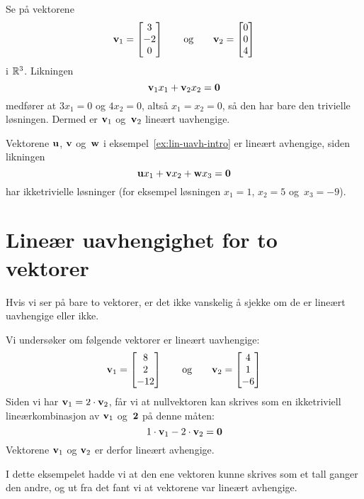 \begin{ex}
Se på vektorene
\[
\mathbf{v}_1 = \begin{bmatrix} 3 \\ -2 \\ 0 \end{bmatrix}
\qquad\text{og}\qquad
\mathbf{v}_2 = \begin{bmatrix} 0 \\ 0 \\ 4 \end{bmatrix}
\]
i $\mathbb{R}^3$.  Likningen
\[
\mathbf{v}_1 x_1 + \mathbf{v}_2 x_2 = \mathbf{0}
\]
medfører at $3x_1 = 0$ og $4 x_2 = 0$, altså $x_1 = x_2 = 0$, så den
har bare den trivielle løsningen.  Dermed er $\mathbf{v}_1$ og~$\mathbf{v}_2$
lineært uavhengige.
\end{ex}

\begin{ex}
Vektorene $\mathbf{u}$, $\mathbf{v}$ og~$\mathbf{w}$ i
eksempel~\ref{ex:lin-uavh-intro} er lineært avhengige, siden likningen
\[
\mathbf{u} x_1 + \mathbf{v} x_2 + \mathbf{w} x_3 = \mathbf{0}
\]
har ikketrivielle løsninger (for eksempel løsningen $x_1 = 1$,
$x_2 = 5$ og~$x_3 = -9$).
\end{ex}



\section*{Lineær uavhengighet for to vektorer}

Hvis vi ser på bare to vektorer, er det ikke vanskelig å sjekke om de
er lineært uavhengige eller ikke.

\begin{ex}
\label{ex:to-vektorer-lin-avh}
Vi undersøker om følgende vektorer er lineært uavhengige:
\[
\mathbf{v}_1 = \begin{bmatrix} 8 \\ 2 \\ -12 \end{bmatrix}
\qquad\text{og}\qquad
\mathbf{v}_2 = \begin{bmatrix} 4 \\ 1 \\ -6 \end{bmatrix}
\]
Siden vi har $\mathbf{v}_1 = 2 \cdot \mathbf{v}_2$, får vi at nullvektoren kan
skrives som en ikketriviell lineærkombinasjon av $\mathbf{v}_1$ og~$\mathbf{2}$
på denne måten:
\[
1 \cdot \mathbf{v}_1 - 2 \cdot \mathbf{v}_2 = \mathbf{0}
\]
Vektorene $\mathbf{v}_1$ og $\mathbf{v}_2$ er derfor lineært avhengige.
\end{ex}

I dette eksempelet hadde vi at den ene vektoren kunne skrives som et
tall ganger den andre, og ut fra det fant vi at vektorene var lineært
avhengige.

